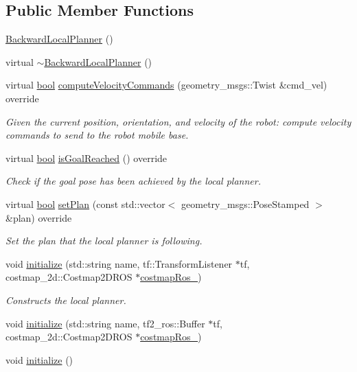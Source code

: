 \subsection*{Public Member Functions}
\begin{DoxyCompactItemize}
\item 
\hyperlink{classbackward__local__planner_1_1BackwardLocalPlanner_a54905830515c7e8ffeecdae050ce08d8}{Backward\+Local\+Planner} ()
\item 
virtual \hyperlink{classbackward__local__planner_1_1BackwardLocalPlanner_aab1430f79670f07bf21d0b796539f3e8}{$\sim$\+Backward\+Local\+Planner} ()
\item 
virtual \hyperlink{classbool}{bool} \hyperlink{classbackward__local__planner_1_1BackwardLocalPlanner_ad7145b72592b48a21631befcdfbd14f0}{compute\+Velocity\+Commands} (geometry\+\_\+msgs\+::\+Twist \&cmd\+\_\+vel) override
\begin{DoxyCompactList}\small\item\em Given the current position, orientation, and velocity of the robot\+: compute velocity commands to send to the robot mobile base. \end{DoxyCompactList}\item 
virtual \hyperlink{classbool}{bool} \hyperlink{classbackward__local__planner_1_1BackwardLocalPlanner_a63beb009f6c230d133ba34b16ce0b189}{is\+Goal\+Reached} () override
\begin{DoxyCompactList}\small\item\em Check if the goal pose has been achieved by the local planner. \end{DoxyCompactList}\item 
virtual \hyperlink{classbool}{bool} \hyperlink{classbackward__local__planner_1_1BackwardLocalPlanner_ad2f7c554f1e107a58ac650d377646f27}{set\+Plan} (const std\+::vector$<$ geometry\+\_\+msgs\+::\+Pose\+Stamped $>$ \&plan) override
\begin{DoxyCompactList}\small\item\em Set the plan that the local planner is following. \end{DoxyCompactList}\item 
void \hyperlink{classbackward__local__planner_1_1BackwardLocalPlanner_a2892c597ff24b2b11993011f52df1570}{initialize} (std\+::string name, tf\+::\+Transform\+Listener $\ast$tf, costmap\+\_\+2d\+::\+Costmap2\+D\+R\+OS $\ast$\hyperlink{classbackward__local__planner_1_1BackwardLocalPlanner_a0d1ac7384b0b241f4b77a0490165430a}{costmap\+Ros\+\_\+})
\begin{DoxyCompactList}\small\item\em Constructs the local planner. \end{DoxyCompactList}\item 
void \hyperlink{classbackward__local__planner_1_1BackwardLocalPlanner_a548a42d0016ef3a404783aca7169cae7}{initialize} (std\+::string name, tf2\+\_\+ros\+::\+Buffer $\ast$tf, costmap\+\_\+2d\+::\+Costmap2\+D\+R\+OS $\ast$\hyperlink{classbackward__local__planner_1_1BackwardLocalPlanner_a0d1ac7384b0b241f4b77a0490165430a}{costmap\+Ros\+\_\+})
\item 
void \hyperlink{classbackward__local__planner_1_1BackwardLocalPlanner_a49b011a3be1e39c1741c98d5dc377f55}{initialize} ()
\end{DoxyCompactItemize}
